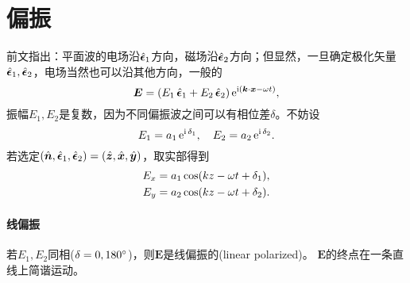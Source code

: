 \section{偏振}
前文指出：平面波的电场沿$\uvec\epsilon_1$方向，磁场沿$\uvec\epsilon_2$方向；但显然，一旦确定极化矢量$\uvec\epsilon_1,\uvec\epsilon_2$，电场当然也可以沿其他方向，一般的
\[
    \bm E=(E_1\uvec\epsilon_1+E_2\uvec\epsilon_2)\e{\i(\bm k\cdot\bm x-\omega t)},
\]
振幅$E_1,E_2$是复数，因为不同偏振波之间可以有相位差$\delta$。不妨设
\[
    E_1=a_1\e{\i\vd_1},\quad E_2=a_2\e{\i\vd_2}.
\]
若选定$(\uvec n,\uvec\epsilon_1,\uvec\epsilon_2)=(\uvec z,\uvec x,\uvec y)$，取实部得到
\begin{align*}
    E_x&=a_1\cos(kz-\omega t+\vd_1),\\
    E_y&=a_2\cos(kz-\omega t+\vd_2).
\end{align*}
\paragraph{线偏振}
若$E_1,E_2$同相($\vd=0,180\degree$)，则$\bm E$是线偏振的(linear polarized)。%
$\bm E$的终点在一条直线上简谐运动。
\begin{center}
\end{center}
